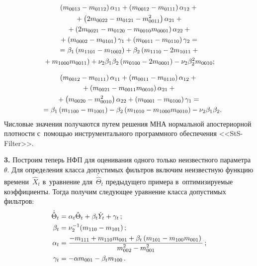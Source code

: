 \begin{multicols}{2}
{ \vspace*{-10pt}

    \noindent
    \begin{multline*}
   \left(m_{0013}-m_{0112}\right)\alpha_{11} + \left( m_{0012}-m_{0111}\right)\alpha_{12} +{}\\
   {}+\left(2m_{0022}-m_{0121}-m_{0011}^2\right) \alpha_{21}+{}\\
{}+ \left(2m_{0021}-m_{0120}-m_{0010}m_{0001}\right)\alpha_{22} +{}\\
{}+\left(m_{0002}-m_{0101}\right)\gamma_1+ \left(m_{0011}-m_{0110}\right)\gamma_2 ={}\\
{}=\beta_1
\left(m_{1101}-m_{1002}\right) +\beta_2 \left(m_{1110}-2 m_{1011}+{}\right.\\
\!\left.{}+m_{1000}m_{0011}\right)+ \nu_2 \beta_1\beta_2 \left(m_{0100}-2m_{0001}\right)-\nu_2\beta_2^2 m_{0010};
\end{multline*}

 \vspace*{-10pt}

    \noindent
    \begin{multline*}
   \left(m_{0012}-m_{0111}\right) \alpha_{11} +\left(m_{0011}-m_{0110}\right)\alpha_{12} + {}\\
   {}+\left(m_{0021}-m_{0011}m_{0010}\right)\alpha_{21}+{}\\
{}+ \left(m_{0020}-m_{0010}^2\right)\alpha_{22} +\left(m_{0001}-m_{0100}\right)\gamma_1={}\\
\!{}= \beta_1 \left(m_{1100}-m_{1001}\right)-\beta_2
\left(m_{1010}-m_{1000}m_{0010}\right) -\nu_2 \beta_1\beta_2.\hspace*{-9.5pt}
\end{multline*}
Числовые значения получаются путем решения МНА нормальной апостериорной плот\-ности с~по\-мощью инструментального программного обеспечения <<StS-Filter>>.

\smallskip

\textbf{3.} Построим теперь  НФП для оценивания одного только неизвестного параметра~$\theta$. Для определения класса допустимых фильтров включим
неизвестную функцию времени~$\hat{X}_t$ в~уравнение для~$\dot{\hat
\Theta}_t$ предыдущего примера в~оптимизируемые коэффициенты.
Тогда получим следующее уравнение класса допустимых фильтров:
\begin{align*}
    \dot{\hat \Theta}_t& =\alpha _t\hat \Theta_t +\beta_t \dot Y_t +\gamma_t\,;
    \\
    \beta_t&= \nu_2^{-1} (m_{110} -m_{101})\,;
    \\
    \alpha_t&=\displaystyle\frac{\displaystyle -m_{111}+m_{110}m_{001}+\beta_t \left(m_{101}-m_{100}m_{001}\right)\mathstrut}{\displaystyle m_{002}^2-m_{001}^2\mathstrut}\,;
    \\
    \gamma_t&=-\alpha m_{001}-\beta_t m_{100}\,.
    \end{align*}

}
\end{multicols}
